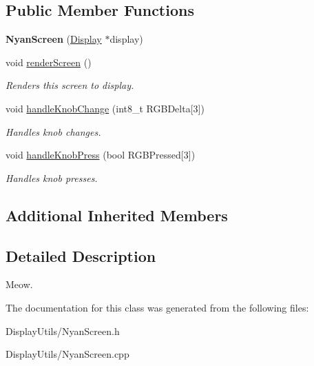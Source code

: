 \subsection*{Public Member Functions}
\begin{DoxyCompactItemize}
\item 
\mbox{\label{classNyanScreen_acd188f631e8e0ce657b31b94a1fcaed0}} 
{\bfseries Nyan\+Screen} (\mbox{\hyperlink{classDisplay}{Display}} $\ast$display)
\item 
\mbox{\label{classNyanScreen_aae9641b13b885eab16ae3bc9e91dee36}} 
void \mbox{\hyperlink{classNyanScreen_aae9641b13b885eab16ae3bc9e91dee36}{render\+Screen}} ()
\begin{DoxyCompactList}\small\item\em Renders this screen to display. \end{DoxyCompactList}\item 
\mbox{\label{classNyanScreen_a7fc740bda8f8a3147565433264f4bb4f}} 
void \mbox{\hyperlink{classNyanScreen_a7fc740bda8f8a3147565433264f4bb4f}{handle\+Knob\+Change}} (int8\+\_\+t R\+G\+B\+Delta\mbox{[}3\mbox{]})
\begin{DoxyCompactList}\small\item\em Handles knob changes. \end{DoxyCompactList}\item 
\mbox{\label{classNyanScreen_a5c59bde088c7e56a616c99cd51f6ab82}} 
void \mbox{\hyperlink{classNyanScreen_a5c59bde088c7e56a616c99cd51f6ab82}{handle\+Knob\+Press}} (bool R\+G\+B\+Pressed\mbox{[}3\mbox{]})
\begin{DoxyCompactList}\small\item\em Handles knob presses. \end{DoxyCompactList}\end{DoxyCompactItemize}
\subsection*{Additional Inherited Members}


\subsection{Detailed Description}
Meow. 

The documentation for this class was generated from the following files\+:\begin{DoxyCompactItemize}
\item 
Display\+Utils/Nyan\+Screen.\+h\item 
Display\+Utils/Nyan\+Screen.\+cpp\end{DoxyCompactItemize}
